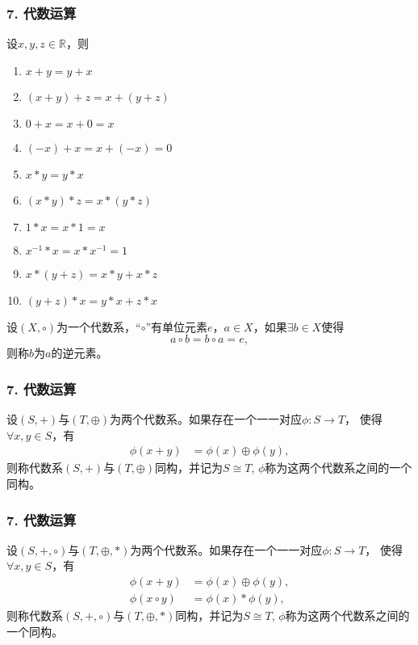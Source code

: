 \documentclass{beamer}
\begin{document}
\begin{CJK*}{UTF8}{gbsn}
\begin{frame}
  \frametitle{7. 代数运算}
  \begin{minipage}[t]{0.49\linewidth}
  \begin{block}{}
    设$x, y, z \in \mathbb{R}$，则
   \begin{enumerate}
   \item   $x + y = y + x$
   \item   $(x + y) + z = x + (y + z)$
   \item   $0 + x = x + 0 = x$
   \item   $(-x) + x = x + (-x) = 0$
   \item   $x * y = y * x$
   \item   $(x * y) * z = x * (y *z)$
   \item   $1 * x = x * 1 = x$
   \item   $x^{-1} * x = x * x^{-1} = 1$
   \item   $x* (y + z) = x * y + x * z$
   \item   $(y + z) * x = y * x + z * x$
    \end{enumerate}
  \end{block}\pause
\end{minipage}
\begin{minipage}[t]{0.49\linewidth}
  \begin{Def}
    设$(X, \circ)$为一个代数系，“$\circ$”有单位元素$e$，$a\in X$，如果$\exists b\in X$使得\[a\circ b = b \circ a = e,\]  则称$b$为$a$的\alert{逆元素}。
  \end{Def}
\end{minipage}
\end{frame}

\begin{frame}
  \frametitle{7. 代数运算}
  \begin{Def}
    设$(S,+)$与$(T, \oplus)$为两个代数系。如果存在一个一一对应$\phi:S\to T$， 使得$\forall x, y \in S$，有
    \begin{align*}
      \phi(x+y) &= \phi(x) \oplus \phi(y),
    \end{align*}
    则称代数系$(S,+)$与$(T, \oplus)$\alert{同构}，并记为$S\cong T$, $\phi$称为这两个代数系之间的一个同构。
  \end{Def}
\end{frame}

\begin{frame}
  \frametitle{7. 代数运算}
  \begin{Def}
    设$(S,+, \circ)$与$(T, \oplus, *)$为两个代数系。如果存在一个一一对应$\phi:S\to T$， 使得$\forall x, y \in S$，有
    \begin{align*}
      \phi(x+y) &= \phi(x) \oplus \phi(y),\\
      \phi(x\circ y)&= \phi(x) * \phi(y),
    \end{align*}
    则称代数系$(S,+,\circ)$与$(T, \oplus, *)$\alert{同构}，并记为$S\cong T$, $\phi$称为这两个代数系之间的一个同构。
  \end{Def}
\end{frame}


\end{CJK*}
\end{document}
